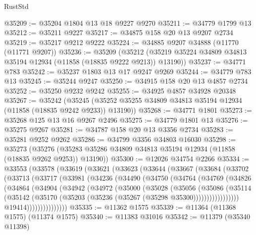 \begin{lexlean}{RustStd}
\begin{coremodule}
@35209 := @35204 @1804 @13 @18 @9227 @9270
@35211 := @34779 @1799 @13
@35212 := @35211 @9227
@35217 := @34875 @158 @20 @13 @9207 @2734
@35219 := @35217 @9212 @9222
@35224 := @34885 @9207 @34888 (@11770 (@11771 @9207))
@35236 := @35209
    (@35212 (@35219 @35224 @34809 @34813 @35194 @12934 (@11858 (@18835 @9222 @9213)) @13190))
@35237 := @34771 @783
@35242 := @35237 @1803 @13 @17 @9247 @9269
@35244 := @34779 @783 @13
@35245 := @35244 @9247
@35250 := @34915 @158 @20 @13 @4857 @2734
@35252 := @35250 @9232 @9242
@35255 := @34925 @4857 @34928 @20348
@35267 := @35242
    (@35245 (@35252 @35255 @34809 @34813 @35194 @12934 (@11858 (@18835 @9242 @9233)) @13190))
@35268 := @34771 @1801
@35273 := @35268 @125 @13 @16 @9267 @2496
@35275 := @34779 @1801 @13
@35276 := @35275 @9267
@35281 := @34787 @158 @20 @13 @3356 @2734
@35283 := @35281 @9252 @9262
@35286 := @34799 @3356 @34803 @16030
@35298 := @35273
    (@35276 (@35283 @35286 @34809 @34813 @35194 @12934 (@11858 (@18835 @9262 @9253)) @13190))
@35300 := @12026 @34754 @2266
@35334 := @33553
    (@33578
      (@33619
        (@33621
          (@33623
            (@33644
              (@33667
                (@33684
                  (@33702
                    (@33713
                      (@33717
                        (@33981
                          (@34236
                            (@34490
                              (@34750
                                (@34764
                                  (@34769
                                    (@34826
                                      (@34864
                                        (@34904
                                          (@34942
                                            (@34972
                                              (@35000
                                                (@35028
                                                  (@35056
                                                    (@35086
                                                      (@35114
                                                        (@35142
                                                          (@35170
                                                            (@35203
                                                              (@35236
                                                                (@35267
                                                                  (@35298 @35300)))))))))))))))))
                                  @19414)))))))))))))))
@35335 := @11362 @1575
@35339 := @11364 (@11368 @1575) (@11374 @1575)
@35340 := @11383 @31016
@35342 := @11379 (@35340 @11398)

\end{coremodule}
\end{lexlean}
